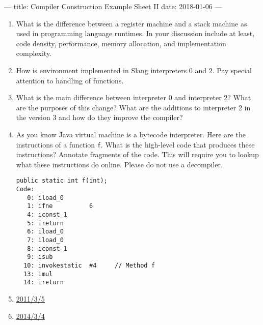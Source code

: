 ---
title: Compiler Construction Example Sheet II
date: 2018-01-06
---



\begin{enumerate}
  \item What is the difference between a register machine and a stack machine
    as used in programming language runtimes. In your discussion include at
    least, code density, performance, memory allocation, and implementation
    complexity.

  \item How is environment implemented in Slang interpreters 0 and 2. Pay
    special attention to handling of functions.

  \item What is the main difference between interpreter 0 and interpreter 2?
    What are the purposes of this change? What are the additions to interpreter
    2 in the version 3 and how do they improve the compiler?

  \item As you know Java virtual machine is a bytecode interpreter. Here are
    the instructions of a function \texttt{f}. What is the high-level code that
    produces these instructions? Annotate fragments of the code. This will
    require you to lookup what these instructions do online. Please do not use
    a decompiler.

    \begin{verbatim}
public static int f(int);
Code:
   0: iload_0
   1: ifne          6
   4: iconst_1
   5: ireturn
   6: iload_0
   7: iload_0
   8: iconst_1
   9: isub
  10: invokestatic  #4     // Method f
  13: imul
  14: ireturn
    \end{verbatim}

  \item \href{http://www.cl.cam.ac.uk/teaching/exams/pastpapers/y2011p3q5.pdf}{2011/3/5}

  \item \href{http://www.cl.cam.ac.uk/teaching/exams/pastpapers/y2014p3q4.pdf}{2014/3/4}
\end{enumerate}


